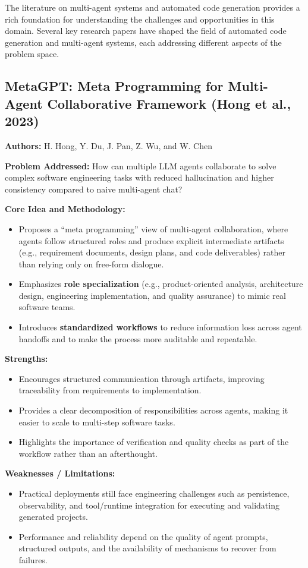The literature on multi-agent systems and automated code generation provides a rich foundation for understanding the challenges and opportunities in this domain. Several key research papers have shaped the field of automated code generation and multi-agent systems, each addressing different aspects of the problem space.

\subsection{MetaGPT: Meta Programming for Multi-Agent Collaborative Framework (Hong et al., 2023)}
\textbf{Authors:} H. Hong, Y. Du, J. Pan, Z. Wu, and W. Chen

\textbf{Problem Addressed:} How can multiple LLM agents collaborate to solve complex software engineering tasks with reduced hallucination and higher consistency compared to naive multi-agent chat?

\textbf{Core Idea and Methodology:}
\begin{itemize}
    \item Proposes a ``meta programming'' view of multi-agent collaboration, where agents follow structured roles and produce explicit intermediate artifacts (e.g., requirement documents, design plans, and code deliverables) rather than relying only on free-form dialogue.
    \item Emphasizes \textbf{role specialization} (e.g., product-oriented analysis, architecture design, engineering implementation, and quality assurance) to mimic real software teams.
    \item Introduces \textbf{standardized workflows} to reduce information loss across agent handoffs and to make the process more auditable and repeatable.
\end{itemize}

\textbf{Strengths:}
\begin{itemize}
    \item Encourages structured communication through artifacts, improving traceability from requirements to implementation.
    \item Provides a clear decomposition of responsibilities across agents, making it easier to scale to multi-step software tasks.
    \item Highlights the importance of verification and quality checks as part of the workflow rather than an afterthought.
\end{itemize}

\textbf{Weaknesses / Limitations:}
\begin{itemize}
    \item Practical deployments still face engineering challenges such as persistence, observability, and tool/runtime integration for executing and validating generated projects.
    \item Performance and reliability depend on the quality of agent prompts, structured outputs, and the availability of mechanisms to recover from failures.
\end{itemize}

